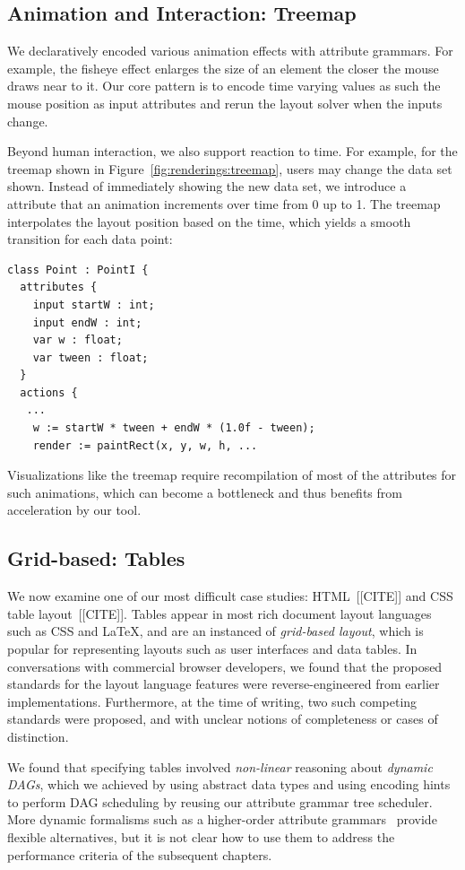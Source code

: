 \subsection{Animation and Interaction: Treemap}
We declaratively encoded various animation effects with attribute grammars. For example, the fisheye effect enlarges the size of an element the closer the mouse draws near to it. Our core pattern is to encode time varying values as such the mouse position as input attributes and rerun the layout solver when the inputs change.

Beyond human interaction, we also support reaction to time. For example, for the treemap shown in Figure~\ref{fig:renderings:treemap}, users may change the data set shown. Instead of immediately showing the new data set, we introduce a  attribute that an animation increments over time from 0 up to 1. The treemap interpolates the layout position based on the time, which yields a smooth transition for each data point:
\begin{lstlisting}
class Point : PointI {
  attributes {
    input startW : int;
    input endW : int;
    var w : float;
    var tween : float;
  }
  actions {
   ...
    w := startW * tween + endW * (1.0f - tween);
    render := paintRect(x, y, w, h, ...
\end{lstlisting}
Visualizations like the treemap require recompilation of most of the attributes for such animations, which can become a bottleneck and thus benefits from acceleration by our tool.

\subsection{Grid-based: Tables}
\label{subsec:tables}
We now examine one of our most difficult case studies: HTML~[[CITE]] and CSS table layout~[[CITE]]. Tables appear in  most rich document layout languages such as CSS and \LaTeX, and are an instanced of \emph{grid-based layout}, which is popular for representing layouts such as user interfaces and data tables. In conversations with commercial browser developers, we found that the proposed standards for the layout language features were reverse-engineered from earlier implementations. Furthermore, at the time of writing, two such competing standards were proposed, and with unclear notions of completeness or cases of distinction.

We found that specifying tables involved \emph{non-linear} reasoning about \emph{dynamic DAGs}, which we achieved by using abstract data types and  using encoding hints to perform DAG scheduling by reusing our attribute grammar tree scheduler. More dynamic formalisms such as a higher-order attribute grammars~\cite{??} provide flexible alternatives, but it is not clear how to use them to address the performance criteria of the subsequent chapters.

